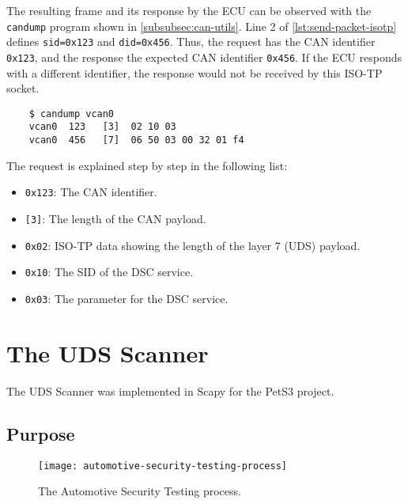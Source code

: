The resulting frame and its response by the ECU can be observed with the \texttt{candump} program shown in \autoref{subsubsec:can-utils}. Line 2 of \autoref{lst:send-packet-isotp} defines \texttt{sid=0x123} and \texttt{did=0x456}. Thus, the request has the CAN identifier \texttt{0x123}, and the response the expected CAN identifier \texttt{0x456}. If the ECU responds with a different identifier, the response would not be received by this ISO-TP socket.

\begin{samepage}
\begin{verbatim}
    $ candump vcan0
    vcan0  123   [3]  02 10 03
    vcan0  456   [7]  06 50 03 00 32 01 f4
\end{verbatim}
\end{samepage}

The request is explained step by step in the following list:

\begin{itemize}
    \item \texttt{0x123}: The CAN identifier.
    \item \texttt{[3]}: The length of the CAN payload.
    \item \texttt{0x02}: ISO-TP data showing the length of the layer 7 (UDS) payload.
    \item \texttt{0x10}: The SID of the DSC service.
    \item \texttt{0x03}: The parameter for the DSC service.
\end{itemize}


\section{The UDS Scanner}

The UDS Scanner was implemented in Scapy for the PetS3 project.

\subsection{Purpose}

\begin{figure}[htb]
    \centering
    \texttt{[image: automotive-security-testing-process]}
    \caption{The Automotive Security Testing process.}
    \label{fig:automotive-security-testing-process}
\end{figure}

